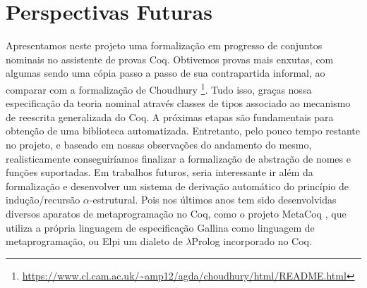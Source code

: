 \chapter{Perspectivas Futuras}\label{chp:perspectivas}
Apresentamos neste projeto uma formalização em progresso de conjuntos nominais no assistente de provas Coq. Obtivemos provas mais enxutas, com algumas sendo uma cópia passo a passo de sua contrapartida informal, ao comparar com a formalização de Choudhury \footnote{\url{https://www.cl.cam.ac.uk/~amp12/agda/choudhury/html/README.html}}. Tudo isso, graças nossa especificação da teoria nominal através classes de tipos associado ao mecanismo de reescrita generalizada do Coq. A próximas etapas são fundamentais para obtenção de uma biblioteca automatizada. Entretanto, pelo pouco tempo restante no projeto, e baseado em nossas observações do andamento do mesmo, realisticamente conseguiríamos finalizar a formalização de abstração de nomes e funções suportadas. Em trabalhos futuros, seria interessante ir além da formalização e desenvolver um sistema de derivação automático do princípio de indução/recursão $\alpha$-estrutural. Pois nos últimos anos tem sido desenvolvidas diversos aparatos de metaprogramação no Coq, como o projeto MetaCoq \cite{Sozeau2020}, que utiliza a própria linguagem de especificação Gallina como linguagem de metaprogramação, ou Elpi \cite{Dunchev2015,Tassi2018} um dialeto de $\lambda$Prolog \cite{Miller2009} incorporado no Coq.